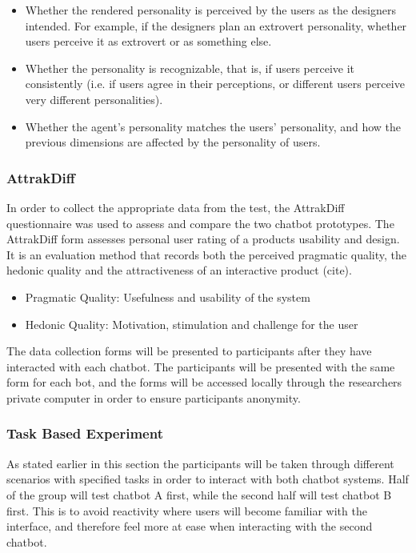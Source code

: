         \begin{itemize}
            \item Whether the rendered personality is perceived by the users as the designers intended. For example, if the designers plan an extrovert personality, whether users perceive it as extrovert or as something else.
            \item Whether the personality is recognizable, that is, if users perceive it consistently (i.e. if users agree in their perceptions, or different users perceive very different personalities).
            \item Whether the agent's personality matches the users' personality, and how the previous dimensions are affected by the personality of users.
        \end{itemize}
            
    \vspace{5mm} %
   
     \subsubsection{AttrakDiff}
    
    In order to collect the appropriate data from the test, the AttrakDiff questionnaire was used to assess and compare the two chatbot prototypes. The AttrakDiff form assesses personal user rating of a products usability and design. It is an evaluation method that records both the perceived pragmatic quality, the hedonic quality and the attractiveness of an interactive product (cite).
    
        \begin{itemize}
            \item Pragmatic Quality: Usefulness and usability of the system
            \item Hedonic Quality: Motivation, stimulation and challenge for the user
        \end{itemize}
        
    The data collection forms will be presented to participants after they have interacted with each chatbot. The participants will be presented with the same form for each bot, and the forms will be accessed locally through the researchers private computer in order to ensure participants anonymity. 
    
   \subsubsection{Task Based Experiment}
   
   As stated earlier in this section the participants will be taken through different scenarios with specified tasks in order to interact with both chatbot systems. Half of the group will test chatbot A first, while the second half will test chatbot B first. This is to avoid reactivity where users will become familiar with the interface, and therefore feel more at ease when interacting with the second chatbot. 
    

   